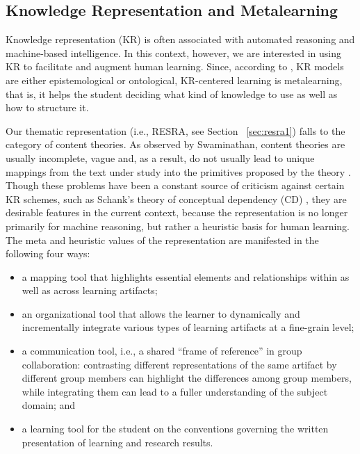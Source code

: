 \subsection{Knowledge Representation and Metalearning}

Knowledge representation (KR) is often associated with automated reasoning
and machine-based intelligence. In this context, however, we are interested
in using KR to facilitate and augment human learning. Since, according to
\cite{Swaminathan90}, KR models are either epistemological or ontological,
KR-centered learning is metalearning, that is, it helps the student deciding 
what kind of knowledge to use as well as how to structure it.

Our thematic representation (i.e., RESRA, see Section ~\ref{sec:resra1})
falls to the category of content theories. As observed by Swaminathan,
content theories are usually incomplete, vague and, as a result, do not
usually lead to unique mappings from the text under study into the
primitives proposed by the theory \cite{Swaminathan90}. Though these
problems have been a constant source of criticism against certain KR
schemes, such as Schank's theory of conceptual dependency (CD)
\cite{Schank75}, they are desirable features in the current context,
because the representation is no longer primarily for machine reasoning,
but rather a heuristic basis for human learning. The meta and heuristic
values of the representation are manifested in the following four ways:

\begin{itemize}

\item a mapping tool that highlights essential elements and relationships
within as well as across learning artifacts;

\item an organizational tool that allows the learner to dynamically and
incrementally integrate various types of learning artifacts at a fine-grain
level;
  
\item a communication tool, i.e., a shared ``frame of reference'' in group
collaboration: contrasting different representations of the same artifact
by different group members can highlight the differences among group members,
while integrating them can lead to a fuller understanding of the subject
domain; and
  
\item a learning tool for the student on the conventions
governing the written presentation of learning and research results.
\end{itemize}


